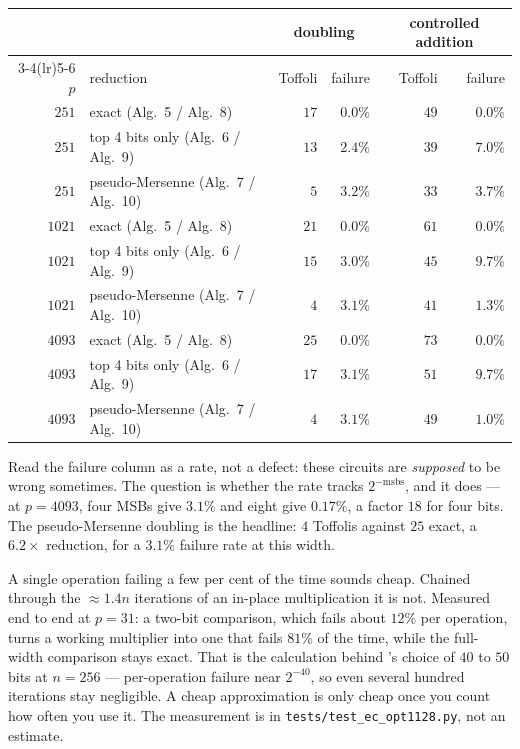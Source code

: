 \documentclass[11pt]{article}
\newcommand{\code}[1]{\texttt{#1}}
\theoremstyle{plain}
\theoremstyle{remark}
\begin{document}
\begin{center}\small
\begin{tabular}{@{}rlrrrr@{}}
\toprule
& & \multicolumn{2}{c}{doubling} & \multicolumn{2}{c}{controlled addition}\\
\cmidrule(lr){3-4}\cmidrule(lr){5-6}
$p$ & reduction & Toffoli & failure & Toffoli & failure\\
\midrule
$251$ & exact (Alg.~5 / Alg.~8) & $17$ & $0.0\%$ & $49$ & $0.0\%$\\
$251$ & top 4 bits only (Alg.~6 / Alg.~9) & $13$ & $2.4\%$ & $39$ & $7.0\%$\\
$251$ & pseudo-Mersenne (Alg.~7 / Alg.~10) & $5$ & $3.2\%$ & $33$ & $3.7\%$\\
$1021$ & exact (Alg.~5 / Alg.~8) & $21$ & $0.0\%$ & $61$ & $0.0\%$\\
$1021$ & top 4 bits only (Alg.~6 / Alg.~9) & $15$ & $3.0\%$ & $45$ & $9.7\%$\\
$1021$ & pseudo-Mersenne (Alg.~7 / Alg.~10) & $4$ & $3.1\%$ & $41$ & $1.3\%$\\
$4093$ & exact (Alg.~5 / Alg.~8) & $25$ & $0.0\%$ & $73$ & $0.0\%$\\
$4093$ & top 4 bits only (Alg.~6 / Alg.~9) & $17$ & $3.1\%$ & $51$ & $9.7\%$\\
$4093$ & pseudo-Mersenne (Alg.~7 / Alg.~10) & $4$ & $3.1\%$ & $49$ & $1.0\%$\\
\bottomrule
\end{tabular}
\end{center}

\noindent
Read the failure column as a rate, not a defect: these circuits are \emph{supposed} to be wrong
sometimes. The question is whether the rate tracks $2^{-\mathrm{msbs}}$, and it does --- at
$p=4093$, four MSBs give $3.1\%$ and eight give $0.17\%$, a factor $18$ for four
bits. The pseudo-Mersenne doubling is the headline: $4$ Toffolis against $25$
exact, a $6.2\times$ reduction, for a $3.1\%$ failure rate at this width.

\begin{warnbox}[title={Failure compounds, which is why the paper's budget is so large}]
A single operation failing a few per cent of the time sounds cheap. Chained through the
$\approx1.4n$ iterations of an in-place multiplication it is not. Measured end to end at $p=31$: a
two-bit comparison, which fails about $12\%$ per operation, turns a working multiplier into one that
fails $81\%$ of the time, while the full-width comparison stays exact. That is the calculation behind \cite{ec:schrott26}'s choice of $40$ to $50$
bits at $n=256$ --- per-operation failure near $2^{-40}$, so even several hundred iterations stay
negligible. A cheap approximation is only cheap once you count how often you use it. The measurement
is in \code{tests/test\_ec\_opt1128.py}, not an estimate.
\end{warnbox}
\end{document}

